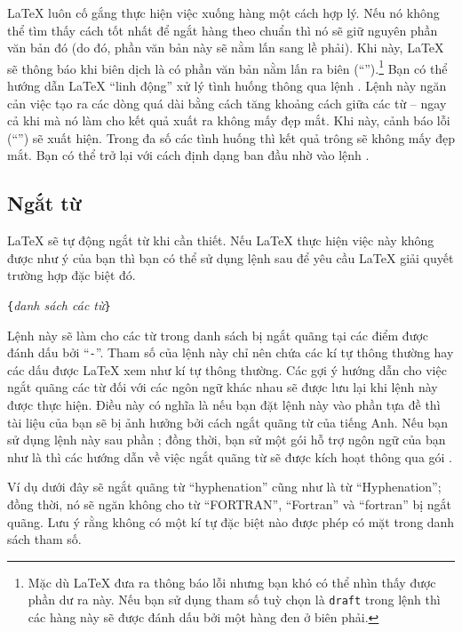 \LaTeX{} luôn cố gắng thực hiện việc xuống hàng một cách hợp lý. Nếu nó không thể tìm thấy cách tốt nhất để ngắt hàng theo chuẩn thì nó sẽ giữ nguyên phần văn bản đó (do đó, phần văn bản này sẽ nằm lấn sang lề phải). Khi này, \LaTeX{} sẽ thông báo khi biên dịch là có phần văn bản nằm lấn ra biên (``'').\footnote{Mặc dù \LaTeX{} đưa ra thông báo lỗi nhưng bạn khó có thể nhìn thấy được phần dư ra này. Nếu bạn sử dụng tham số tuỳ chọn là \texttt{draft} trong lệnh  thì các hàng này sẽ được đánh dấu bởi một hàng đen ở biên phải.} Bạn có thể hướng dẫn \LaTeX{} ``linh động'' xử lý tình huống thông qua lệnh . Lệnh này ngăn cản việc tạo ra các dòng quá dài bằng cách tăng khoảng cách giữa các từ -- ngay cả khi mà nó làm cho kết quả xuất ra không mấy đẹp mắt. Khi này, cảnh báo lỗi (``'') sẽ xuất hiện. Trong đa số các tình huống thì kết quả trông sẽ không mấy đẹp mắt. Bạn có thể trở lại với cách định dạng ban đầu nhờ vào lệnh .

\subsection{Ngắt từ} \label{hyph}
\LaTeX{} sẽ tự động ngắt từ khi cần thiết. Nếu \LaTeX{} thực hiện việc này không được như ý của bạn thì bạn có thể sử dụng lệnh sau để yêu cầu \LaTeX{} giải quyết trường hợp đặc biệt đó.

\begin{lscommand}
\verb|{|\emph{danh sách các từ}\verb|}|
\end{lscommand}
\noindent Lệnh này sẽ làm cho các từ trong danh sách bị ngắt quãng tại các điểm được đánh dấu bởi ``\verb|-|''. Tham số của lệnh này chỉ nên chứa các kí tự thông thường hay các dấu được \LaTeX{} xem như kí tự thông thường. Các gợi ý hướng dẫn cho việc ngắt quãng các từ đối với các ngôn ngữ khác nhau sẽ được lưu lại khi lệnh này được thực hiện. Điều này có nghĩa là nếu bạn đặt lệnh này vào phần tựa đề thì tài liệu của bạn sẽ bị ảnh hưởng bởi cách ngắt quãng từ của tiếng Anh. Nếu bạn sử dụng lệnh này sau phần \verb||; đồng thời, bạn sử một gói hỗ trợ ngôn ngữ
của bạn như là  thì các hướng dẫn về việc ngắt quãng từ sẽ được kích hoạt thông qua gói .

Ví dụ dưới đây sẽ ngắt quãng từ ``hyphenation'' cũng như là từ ``Hyphenation''; đồng thời, nó sẽ ngăn không cho từ ``FORTRAN'', ``Fortran'' và ``fortran'' bị ngắt quãng. Lưu ý rằng không có một kí tự đặc biệt nào được phép có mặt trong danh sách tham số.

